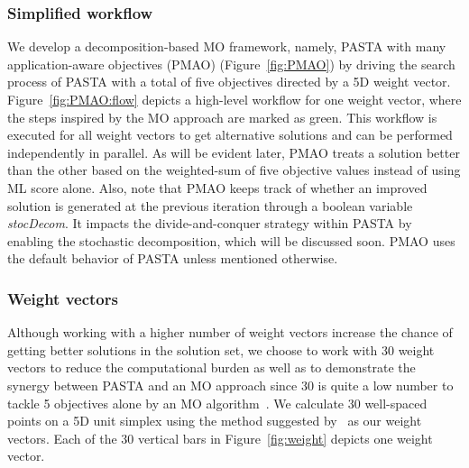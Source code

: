 \subsubsection{Simplified workflow}
We develop a decomposition-based MO framework, namely, PASTA with many application-aware objectives (PMAO) (Figure~\ref{fig:PMAO}) by driving the search process of PASTA with a total of five objectives directed by a 5D weight vector. Figure~\ref{fig:PMAO:flow} depicts a high-level workflow for one weight vector, where the steps inspired by the MO approach are marked as green. This workflow is executed for all weight vectors to get alternative solutions and can be performed independently in parallel. As will be evident later, PMAO treats a solution better than the other based on the weighted-sum of five objective values instead of using ML score alone. Also, note that PMAO keeps track of whether an improved solution is generated at the previous iteration through a boolean variable \textit{stocDecom}. It impacts the divide-and-conquer strategy within PASTA by enabling the stochastic decomposition, which will be discussed soon. PMAO uses the default behavior of PASTA unless mentioned otherwise.

\subsubsection{Weight vectors}
Although working with a higher number of weight vectors increase the chance of getting better solutions in the solution set, we choose to work with 30 weight vectors to reduce the computational burden as well as to demonstrate the synergy between PASTA and an MO approach since 30 is quite a low number to tackle 5 objectives alone by an MO algorithm~\cite{deb2014evolutionary}. We calculate 30 well-spaced points on a 5D unit simplex using the method suggested by~\cite{ref_dirs_energy} as our weight vectors. Each of the 30 vertical bars in Figure~\ref{fig:weight} depicts one weight vector. 

